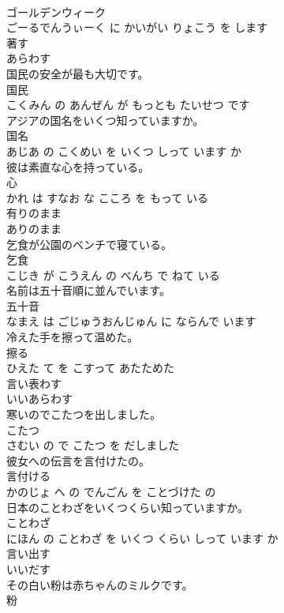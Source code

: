 \documentclass[8pt]{extreport}
\begin{document}
\begin{CJK}{UTF8}{min}
\\	ゴールデンウィーク 
\\	ごーるでんうぃーく に かいがい りょこう を します			
\\	著す	
\\	あらわす		
\\	国民の安全が最も大切です。	
\\	国民 
\\	こくみん の あんぜん が もっとも たいせつ です			
\\	アジアの国名をいくつ知っていますか。	
\\	国名 
\\	あじあ の こくめい を いくつ しって います か			
\\	彼は素直な心を持っている。	
\\	心 
\\	かれ は すなお な こころ を もって いる			
\\	有りのまま	
\\	ありのまま		
\\	乞食が公園のベンチで寝ている。	
\\	乞食 
\\	こじき が こうえん の べんち で ねて いる			
\\	名前は五十音順に並んでいます。	
\\	五十音 
\\	なまえ は ごじゅうおんじゅん に ならんで います			
\\	冷えた手を擦って温めた。	
\\	擦る 
\\	ひえた て を こすって あたためた			
\\	言い表わす	
\\	いいあらわす		
\\	寒いのでこたつを出しました。	
\\	こたつ 
\\	さむい の で こたつ を だしました			
\\	彼女への伝言を言付けたの。	
\\	言付ける 
\\	かのじょ へ の でんごん を ことづけた の			
\\	日本のことわざをいくつくらい知っていますか。	
\\	ことわざ 
\\	にほん の ことわざ を いくつ くらい しって います か			
\\	言い出す	
\\	いいだす		
\\	その白い粉は赤ちゃんのミルクです。	
\\	粉 

\end{CJK}
\end{document}
